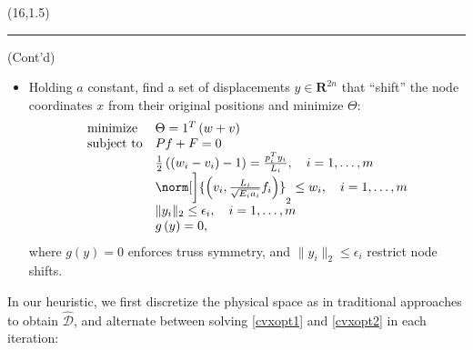 \documentclass[a0]{a0poster}
\renewenvironment{leftbar}[1][\hsize]
{%
\def\FrameCommand 
{%

    {\color{black}\vrule width 0pt}%
    \hspace{0pt}%
    \fboxsep=\FrameSep\colorbox{white}%
}%
\MakeFramed{\hsize#1\advance\hsize-\width\FrameRestore}%
}
{\endMakeFramed}
\begin{document}
\begin{textblock}{7.0}(16,1.5)

\hrule
\medskip
(Cont'd)

\begin{itemize}

  \item Holding \(a\) constant, find a set of displacements \(y\in\mathbf{R}^{2n}\) that ``shift'' the node coordinates \(x\) from their original positions and minimize \(\Theta\):
  {\small
  \begin{equation}
    \begin{array}{ll}
      \mbox{minimize}   & \Theta = 1^{T}\left(w+v \right)\\
      \mbox{subject to} & Pf+F = 0\\
                        & \frac{1}{2}\left( \left( w_{i} - v_{i} \right) - 1 \right) = \frac{p_{i}^{T}y_{i}}{L_{i}},\ \ \ i = 1,\ldots,m\\
                        & \norm[\bigg]{ \left( v_{i},\frac{L_{i}}{\sqrt{E_{i}a_{i}}}f_{i} \right)}_{2}\leq w_{i},\ \ \ i = 1,\ldots,m\\
                        & \|y_{i}\|_{2} \leq \epsilon_{i},\ \ \ i = 1,\ldots,m\\
                            & g\left(y\right) = 0,
    \end{array}
    \label{cvxopt2}
  \end{equation}
  }
  where \(g(y) = 0 \) enforces truss symmetry, and \(\|y_{i}\|_{2} \leq\epsilon_{i}\) restrict node shifts.

\end{itemize}
  
In our heuristic, we first discretize the physical space as in traditional approaches to obtain \(\hat{\mathcal{D}}\), and alternate between solving \eqref{cvxopt1} and \eqref{cvxopt2} in each iteration:
\medskip


\end{textblock}
\end{document}

